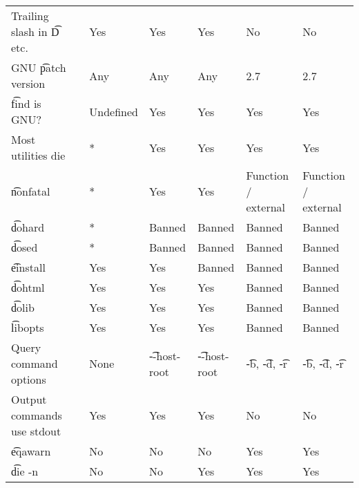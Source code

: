 \begin{landscape}
\begin{longtable}{llP{7.5em}P{7.5em}P{7.5em}P{7.5em}P{7.5em}}
Trailing slash in \t{D} etc. &  &
    Yes & Yes & Yes & No & No \\

GNU \t{patch} version &  &
    Any & Any & Any & 2.7 & 2.7 \\

\t{find} is GNU? &  &
    Undefined & Yes & Yes & Yes & Yes \\

Most utilities die &  &
    * & Yes & Yes & Yes & Yes \\

\t{nonfatal} &  &
    * & Yes & Yes & Function / external & Function / external \\

\t{dohard} &  &
    * & Banned & Banned & Banned & Banned \\

\t{dosed} &  &
    * & Banned & Banned & Banned & Banned \\

\t{einstall} &  &
    Yes & Yes & Banned & Banned & Banned \\

\t{dohtml} &  &
    Yes & Yes & Yes & Banned & Banned \\

\t{dolib} &  &
    Yes & Yes & Yes & Banned & Banned \\

\t{libopts} &  &
    Yes & Yes & Yes & Banned & Banned \\

Query command options &  &
    None & \t{-{}-host-root} & \t{-{}-host-root} & \t{-b}, \t{-d}, \t{-r} &
    \t{-b}, \t{-d}, \t{-r} \\

Output commands use stdout &  &
    Yes & Yes & Yes & No & No \\

\t{eqawarn} &  &
    No & No & No & Yes & Yes \\

\t{die -n} &  &
    No & No & Yes & Yes & Yes \\


\end{longtable}
\end{landscape}
